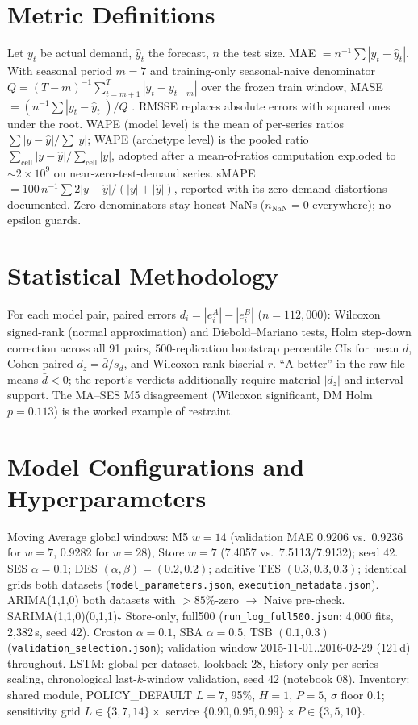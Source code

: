\section{Metric Definitions}
\label{app:metrics}
Let $y_t$ be actual demand, $\hat y_t$ the forecast, $n$ the test size. MAE
$=n^{-1}\sum|y_t-\hat y_t|$. With seasonal period $m=7$ and training-only
seasonal-naive denominator $Q=(T-m)^{-1}\sum_{t=m+1}^{T}|y_t-y_{t-m}|$ over the
frozen train window, MASE $=(n^{-1}\sum|y_t-\hat y_t|)/Q$
\citep{hyndman2006}. RMSSE replaces absolute errors with squared ones under
the root. WAPE (model level) is the mean of per-series ratios
$\sum|y-\hat y|/\sum|y|$; WAPE (archetype level) is the pooled ratio
$\sum_{\text{cell}}|y-\hat y|/\sum_{\text{cell}}|y|$, adopted after a
mean-of-ratios computation exploded to $\sim2\times10^9$ on
near-zero-test-demand series. sMAPE $=100\,n^{-1}\sum 2|y-\hat y|/(|y|+|\hat
y|)$, reported with its zero-demand distortions documented. Zero denominators
stay honest NaNs ($n_{\text{NaN}}=0$ everywhere); no epsilon guards.

\section{Statistical Methodology}
\label{app:stats}
For each model pair, paired errors $d_i=|e^A_i|-|e^B_i|$ ($n=112{,}000$):
Wilcoxon signed-rank (normal approximation) and Diebold--Mariano
\citep{diebold1995} tests, Holm step-down correction \citep{holm1979} across
all 91 pairs, 500-replication bootstrap percentile CIs for mean $d$, Cohen
paired $d_z=\bar d/s_d$, and Wilcoxon rank-biserial $r$. ``A better'' in the
raw file means $\bar d<0$; the report's verdicts additionally require material
$|d_z|$ and interval support. The MA--SES M5 disagreement (Wilcoxon
significant, DM Holm $p=0.113$) is the worked example of restraint.

\section{Model Configurations and Hyperparameters}
\label{app:configs}
Moving Average global windows: M5 $w=14$ (validation MAE 0.9206 vs.\ 0.9236
for $w=7$, 0.9282 for $w=28$), Store $w=7$ (7.4057 vs.\ 7.5113/7.9132); seed
42. SES $\alpha=0.1$; DES $(\alpha,\beta)=(0.2,0.2)$; additive TES
$(0.3,0.3,0.3)$; identical grids both datasets
(\texttt{model\_parameters.json}, \texttt{execution\_metadata.json}).
ARIMA(1,1,0) both datasets with $>85\%$-zero $\rightarrow$ Naive pre-check.
SARIMA(1,1,0)(0,1,1)$_7$ Store-only, full500
(\texttt{run\_log\_full500.json}: 4,000 fits, 2,382\,s, seed 42).
Croston $\alpha=0.1$, SBA $\alpha=0.5$, TSB $(0.1,0.3)$
(\texttt{validation\_selection.json}); validation window 2015-11-01..2016-02-29
(121\,d) throughout. LSTM: global per dataset, lookback 28, history-only
per-series scaling, chronological last-$k$-window validation, seed 42
(notebook 08). Inventory: shared module, POLICY\_DEFAULT $L=7$, 95\%,
$H=1$, $P=5$, $\sigma$ floor 0.1; sensitivity grid $L\in\{3,7,14\}\times$
service $\{0.90,0.95,0.99\}\times P\in\{3,5,10\}$.

